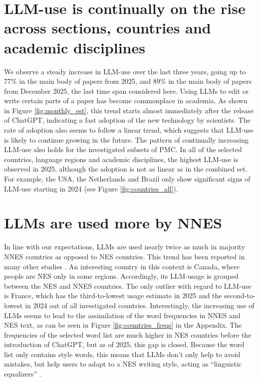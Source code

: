 \section{LLM-use is continually on the rise across sections, countries and academic disciplines}
We observe a steady increase in LLM-use over the last three years, going up to $77\%$ in the main body of papers from 2025, and $89\%$ in the main body of papers from December 2025, the last time span considered here.
Using LLMs to edit or write certain parts of a paper has become commonplace in academia.
As shown in Figure \ref{fig:monthly_est}, this trend starts almost immediately after the release of ChatGPT, indicating a fast adoption of the new technology by scientists.
The rate of adoption also seems to follow a linear trend, which suggests that LLM-use is likely to continue growing in the future.
The pattern of continually increasing LLM-use also holds for the investigated subsets of PMC.
In all of the selected countries, language regions and academic disciplines, the highest LLM-use is observed in 2025, although the adoption is not as linear as in the combined set.
For example, the USA, the Netherlands and Brazil only show significant signs of LLM-use starting in 2024 (see Figure \ref{fig:countries_all}).

\section{LLMs are used more by NNES}
In line with our expectations, LLMs are used nearly twice as much in majority NNES countries as opposed to NES countries.
This trend has been reported in many other studies \cite{Liao2024, Lin2025_NES,  Prakash2025}.
An interesting country in this context is Canada, where people are NES only in some regions.
Accordingly, its LLM-usage is grouped between the NES and NNES countries.
The only outlier with regard to LLM-use is France, which has the third-to-lowest usage estimate in 2025 and the second-to-lowest in 2024 out of all investigated countries.
Interestingly, the increasing use of LLMs seems to lead to the assimilation of the word frequencies in NNES and NES text, as can be seen in Figure \ref{fig:countries_freqs} in the Appendix. 
The frequencies of the selected word list are much higher in NES countries before the introduction of ChatGPT, but as of 2025, this gap is closed.
Because the word list only contains style words, this means that LLMs don't only help to avoid mistakes, but help users to adapt to a NES writing style, acting as ``linguistic equalizers'' \cite{Lin2025_NES, Prakash2025}.

